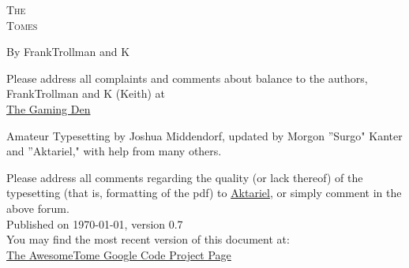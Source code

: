 \pagestyle{plain}

\begin{center} \Huge

\textsc{The\\
Tomes\\
}\end{center}



\vspace{2cm}
\begin{center}\large By FrankTrollman and K\end{center}


\newpage

\vspace*{4in}

\noindent Please address all complaints and comments about balance to the authors, FrankTrollman and K (Keith) at\\
{\color{blue} \href{http://tgdmb.com/viewforum.php?f=1}{The Gaming Den}}

\vspace{0.2in}



\noindent Amateur Typesetting by Joshua Middendorf, updated by Morgon ''Surgo" Kanter and ''Aktariel," with help from many others.\\

\vspace{0.15in}

\noindent Please address all comments regarding the quality (or lack thereof) of the typesetting (that is, formatting of the pdf) to \href{mailto:aktariel@gmail.com}{Aktariel}, or simply comment in the above forum.\\





\vspace{1in}
\noindent Published on \today, version 0.7\\
\noindent You may find the most recent version of this document at:\\
{\color{blue} \href{http://code.google.com/p/awesometome/downloads/list}{The AwesomeTome Google Code Project Page}}

\newpage
